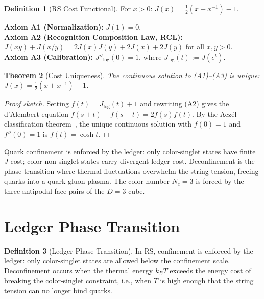 \documentclass[12pt,a4paper]{article}
\newtheorem{theorem}{Theorem}[section]
\theoremstyle{definition}
\newtheorem{definition}[theorem]{Definition}
\theoremstyle{remark}
\begin{document}
\begin{definition}[RS Cost Functional]
For $x > 0$: $J(x) = \tfrac{1}{2}(x + x^{-1}) - 1$.
\end{definition}

\noindent\textbf{Axiom A1 (Normalization):} $J(1) = 0$.\\
\textbf{Axiom A2 (Recognition Composition Law, RCL):}
$J(xy) + J(x/y) = 2J(x)J(y) + 2J(x) + 2J(y)$ for all $x, y > 0$.\\
\textbf{Axiom A3 (Calibration):} $J''_{\log}(0) = 1$, where
$J_{\log}(t) := J(e^t)$.

\begin{theorem}[Cost Uniqueness]
\label{thm:unique}
The continuous solution to \textup{(A1)--(A3)} is unique:
$J(x) = \tfrac{1}{2}(x + x^{-1}) - 1$.
\end{theorem}

\begin{proof}[Proof sketch]
Setting $f(t) = J_{\log}(t) + 1$ and rewriting \textup{(A2)} gives the
d'Alembert equation $f(s+t) + f(s-t) = 2f(s)f(t)$.  By the Acz\'el
classification theorem~\cite{Aczel1966}, the unique continuous solution
with $f(0) = 1$ and $f''(0) = 1$ is $f(t) = \cosh t$.
\end{proof}

\noindent Quark confinement is enforced by the ledger: only color-singlet
states have finite $J$-cost; color-non-singlet states carry divergent
ledger cost.  Deconfinement is the phase transition where thermal
fluctuations overwhelm the string tension, freeing quarks into a
quark-gluon plasma.  The color number $N_c = 3$ is forced by the three
antipodal face pairs of the $D = 3$ cube.

\section{Ledger Phase Transition}
\label{sec:ledger}

\begin{definition}[Ledger Phase Transition]
\label{def:ledger}
In RS, confinement is enforced by the ledger: only color-singlet
states are allowed below the confinement scale.  Deconfinement
occurs when the thermal energy $k_B T$ exceeds the energy cost of
breaking the color-singlet constraint, i.e., when $T$ is high enough
that the string tension can no longer bind quarks.
\end{definition}
\end{document}
